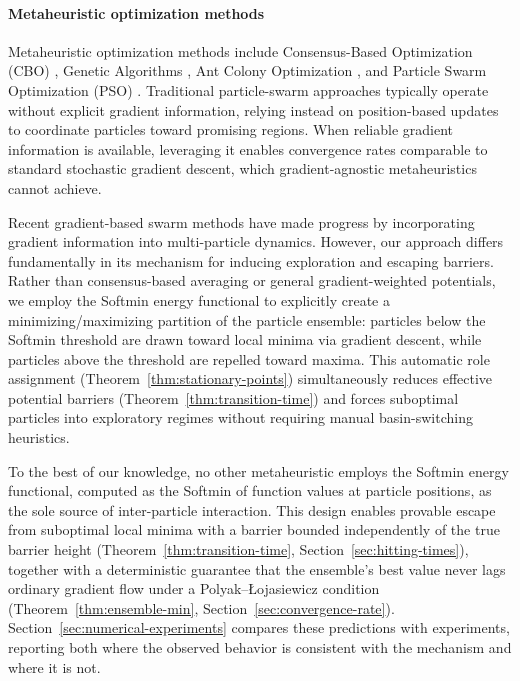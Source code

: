 \documentclass{article} %
\theoremstyle{plain}
\theoremstyle{definition}
\theoremstyle{remark}
\begin{document}
\paragraph{Metaheuristic optimization methods}
Metaheuristic optimization methods include Consensus-Based Optimization (CBO) \citep{CarrilloChoiTotzeckTse2018,fornasier2024consensus,pinnau2017consensus, carrillo2021consensus}, Genetic Algorithms \citep{Goldberg1989}, Ant Colony Optimization \citep{DorigoStutzle2004}, and Particle Swarm Optimization (PSO) \citep{kennedy1995particle, noel2012new}. Traditional particle-swarm approaches typically operate without explicit gradient information, relying instead on position-based updates to coordinate particles toward promising regions. When reliable gradient information is available, leveraging it enables convergence rates comparable to standard stochastic gradient descent, which gradient-agnostic metaheuristics cannot achieve.

Recent gradient-based swarm methods \citep{riedl2023gradient, bolte2024swarm, carrillo2021consensus, noel2012new} have made progress by incorporating gradient information into multi-particle dynamics. However, our approach differs fundamentally in its mechanism for inducing exploration and escaping barriers. Rather than consensus-based averaging or general gradient-weighted potentials, we employ the Softmin energy functional to explicitly create a minimizing/maximizing partition of the particle ensemble: particles below the Softmin threshold are drawn toward local minima via gradient descent, while particles above the threshold are repelled toward maxima. This automatic role assignment (Theorem~\ref{thm:stationary-points}) simultaneously reduces effective potential barriers (Theorem~\ref{thm:transition-time}) and forces suboptimal particles into exploratory regimes without requiring manual basin-switching heuristics.

To the best of our knowledge, no other metaheuristic employs the Softmin energy functional, computed as the Softmin of function values at particle positions, as the sole source of inter-particle interaction. This design enables provable escape from suboptimal local minima with a barrier bounded independently of the true barrier height (Theorem~\ref{thm:transition-time}, Section~\ref{sec:hitting-times}), together with a deterministic guarantee that the ensemble's best value never lags ordinary gradient flow under a Polyak--\L{}ojasiewicz condition (Theorem~\ref{thm:ensemble-min}, Section~\ref{sec:convergence-rate}). Section~\ref{sec:numerical-experiments} compares these predictions with experiments, reporting both where the observed behavior is consistent with the mechanism and where it is not.
\end{document}
